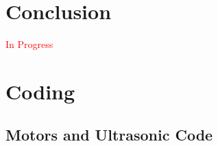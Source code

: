 \documentclass[12pt]{article}
\begin{document}
\section{Conclusion} \label{sec:conclusion}
\begin{center}
	\textcolor{red}{In Progress}
\end{center}

\nocite{*}



\newpage

\appendix
\section{Coding} \label{sec:coding}
\subsection{Motors and Ultrasonic Code} \label{sub:}

\end{document}
